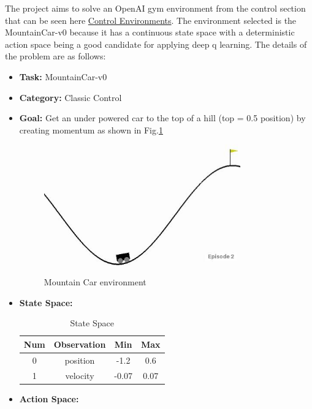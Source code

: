 The project aims to solve an OpenAI gym environment from the control section that can be seen here \href{https://gym.openai.com/envs/#classic_control}{Control Environments}. The environment selected is the MountainCar-v0 because it has a continuous state space with a deterministic action space being a good candidate for applying deep q learning. The details of the problem are as follows:
\begin{itemize}
\item \textbf{Task:} MountainCar-v0
\item \textbf{Category:} Classic Control
\item \textbf{Goal:} Get an under powered car to the top of a hill (top = 0.5 position) by creating momentum as shown in Fig.\ref{fig:car}
\begin{figure}[h]
\centering
\includegraphics[width=0.8\textwidth]{environment.jpg}
\caption{\label{fig:car} Mountain Car environment}
\end{figure}
\item \textbf{State Space:}
      \begin{table}[h]
      \centering
      \begin{tabular}{|c|c|c|c|}
      \hline
      \textbf{Num} & \textbf{Observation} & \textbf{Min} & \textbf{Max} \\ \hline
      0            & position             & -1.2         & 0.6          \\ \hline
      1            & velocity             & -0.07        & 0.07         \\ \hline
      \end{tabular}
      \caption{State Space}
      \label{tab:1}
      \end{table}
\item \textbf{Action Space:}
		\begin{table}[h]
        \centering

\end{table}
\end{itemize}

